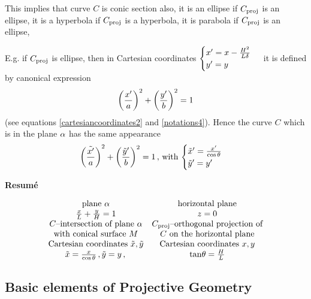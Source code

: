 \documentclass[12pt]{article}
\numberwithin{equation}{section}
\begin{document}
This implies that curve $C$ is conic section also,
it is an ellipse if $C_{\rm proj}$ is an ellipse,
it is a hyperbola if $C_{\rm proj}$ is a hyperbola,
it is parabola  if $C_{\rm proj}$ is an ellipse,

E.g. if $C_{{\rm proj}}$ is ellipse, then
in Cartesian coordinates 
$\begin{cases}x'=x-{H^2\over L\delta}\cr y'=y\cr
     \end{cases}$ it is defined by canonical expression
                $$
\left(x'\over a\right)^2+
\left(y'\over b\right)^2=1
                 $$
(see equations \eqref{cartesiancoordinates2} and 
\eqref{notations4}).   Hence the curve $C$
 which is in the plane $\alpha$ has the same appearance
                $$
\left(\tilde {x'}\over a\right)^2+
\left({\tilde y'}\over b\right)^2=1\,,
              \, {\rm with}\,
 \begin{cases}
   {\tilde x'}={x'\over \cos\theta}
         \cr 
 {\tilde y'}=  y'
       \cr
     \end{cases}
              $$

 \m

    \centerline {\bf Resum\'e}
                 \begin{equation*}
                \begin{matrix}
 \hbox {plane $\alpha$}   &
 \hbox {horizontal plane}  \cr
   {x\over L}+{y\over H}=1 & z=0\cr
    \hbox {$C$--intersection of plane $\alpha$}  &
    \hbox {$C_{\rm proj}$--orthogonal projection of} \cr
  \hbox{with conical surface $M$}
         & \hbox{$C$ on the horizontal plane}\cr
    \hbox{Cartesian coordinates $\tilde x,\tilde y$} &
    \hbox{Cartesian coordinates $x,y$}\cr
       \tilde x={x\over \cos\theta}\,,
         \tilde y=y\,,\,   &  {\rm tan}\theta={H\over L}\cr
              \end{matrix} 
                 \end{equation*}



\subsection{Basic elements of Projective Geometry}
\end{document}
